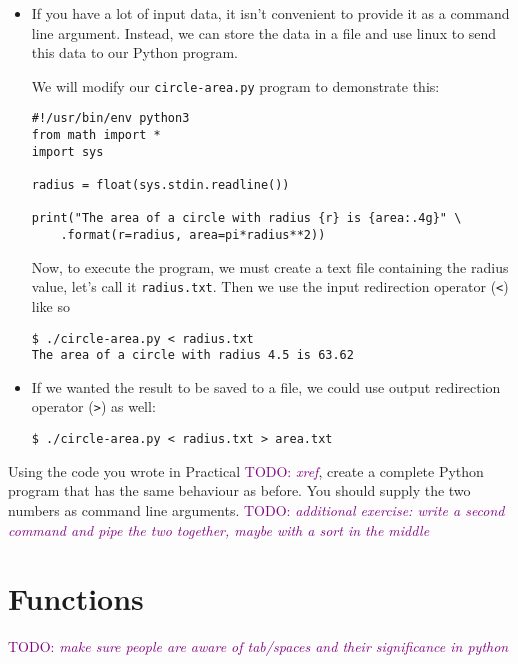 \documentclass[a4paper,twoside]{memoir}
\makeatletter
\newcommand{\FrameTitle}[2]{%
  \fboxrule=\FrameRule \fboxsep=\FrameSep
  \fbox{\vbox{\nobreak \vskip -0.7\FrameSep
    \rlap{\centerline{\strut#1}}\nobreak\nointerlineskip%
    \vskip 0.7\FrameSep
    \hbox{#2}}}}
\newenvironment{framewithtitle}[2][\FrameFirst@Lab\ (cont.)]{%
  \def\FrameFirst@Lab{\textbf{#2}}%
  \def\FrameCont@Lab{\textbf{#1}}%
  \def\FrameCommand##1{%
    \FrameTitle{\FrameFirst@Lab}{##1}}%
  \def\FirstFrameCommand##1{%
    \FrameTitle{\FrameFirst@Lab}{##1}}%
  \def\MidFrameCommand##1{%
    \FrameTitle{\FrameCont@Lab}{##1}}%
  \def\LastFrameCommand##1{%
    \FrameTitle{\FrameCont@Lab}{##1}}%
\MakeFramed{\advance\hsize-\width \FrameRestore}}%
{\endMakeFramed}
\newcounter{exercisectr}
\newenvironment{exercise}
{\stepcounter{exercisectr}\begin{framewithtitle}{Practical \arabic{exercisectr}}}
{\end{framewithtitle}}
\newcommand{\shellcmd}{\texttt}
\newcommand{\TODO}[1]{\textcolor{purple}{TODO: \emph{#1}}}
\makeatother
\begin{document}
\begin{itemize}
\begin{verbatim}
radius = float(sys.argv[1])

print("The area of a circle with radius {r} is {area:.4g}" \
	.format(r=radius, area=pi*radius**2))
\end{verbatim}
Now we can execute the program like this:
\begin{verbatim}
$ ./circle-area.py 4.5
The area of a circle with radius 4.5 is 63.62
\end{verbatim}
The \shellcmd{argv} variable is an array of strings.  We will describe arrays later in section~\TODO{xref}.

\item If you have a lot of input data, it isn't convenient to provide it as a command line argument.  Instead, we can store the data in a file and use linux to send this data to our Python program.

We will modify our \shellcmd{circle-area.py} program to demonstrate this:
\begin{verbatim}
#!/usr/bin/env python3
from math import *
import sys

radius = float(sys.stdin.readline())

print("The area of a circle with radius {r} is {area:.4g}" \
	.format(r=radius, area=pi*radius**2))
\end{verbatim}
Now, to execute the program, we must create a text file containing the radius value, let's call it \shellcmd{radius.txt}.  Then we use the input redirection operator (\shellcmd{<}) like so
\begin{verbatim}
$ ./circle-area.py < radius.txt
The area of a circle with radius 4.5 is 63.62
\end{verbatim}
\item If we wanted the result to be saved to a file, we could use output redirection operator (\shellcmd{>}) as well:
\begin{verbatim}
$ ./circle-area.py < radius.txt > area.txt
\end{verbatim}
\end{itemize}

\begin{exercise}
Using the code you wrote in Practical \TODO{xref}, create a complete Python program that has the same behaviour as before.  You should supply the two numbers as command line arguments.
	\TODO{additional exercise: write a second command and pipe the two together, maybe with a sort in the middle}
\end{exercise}

\section{Functions}
\TODO{make sure people are aware of tab/spaces and their significance in python}
\end{document}

